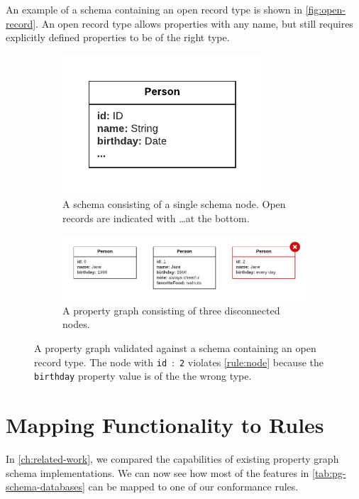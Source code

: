 \documentclass{report}
\theoremstyle{definition}
\begin{document}
An example of a schema containing an open record type is shown in \autoref{fig:open-record}. An open record type allows properties with any name, but still requires explicitly defined properties to be of the right type.

\begin{figure}[t]
  \centering
  \begin{subfigure}[t]{0.8\textwidth}
    \centering
    \includegraphics[scale=0.75]{figures/pg-schema-open-record.pdf}
    \caption{A schema consisting of a single schema node. Open records are indicated with \ldots at the bottom.}
  \end{subfigure}
  \hfill
  \begin{subfigure}[t]{0.8\textwidth}
    \centering
    \includegraphics[scale=0.75]{figures/conformance-open-record.pdf}
    \caption{A property graph consisting of three disconnected nodes.}
  \end{subfigure}
  \caption[A property graph validated against a schema containing an open record type]{A property graph validated against a schema containing an open record type. The node with \texttt{id}~:~\texttt{2} violates \autoref{rule:node} because the \texttt{birthday} property value is of the the wrong type.}
  \label{fig:open-record}
\end{figure}

\section{Mapping Functionality to Rules}

In \autoref{ch:related-work}, we compared the capabilities of existing property graph schema implementations. We can now see how most of the features in \autoref{tab:pg-schema-databases} can be mapped to one of our conformance rules.
\end{document}
